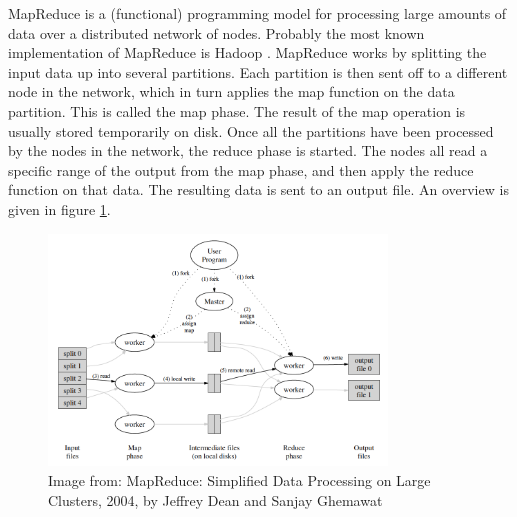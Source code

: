 MapReduce is a (functional) programming model for processing large amounts of data over a distributed network of nodes. Probably the most known implementation of MapReduce is Hadoop \cite{Hadoop}. MapReduce works by splitting the input data up into several partitions. Each partition is then sent off to a different node in the network, which in turn applies the map function on the data partition. This is called the map phase. The result of the map operation is usually stored temporarily on disk. Once all the partitions have been processed by the nodes in the network, the reduce phase is started. The nodes all read a specific range of the output from the map phase, and then apply the reduce function on that data. The resulting data is sent to an output file. An overview is given in figure \ref{fig:mapreduce}.

\begin{figure}[htb]
\includegraphics[width=340px]{mapreduce.png}
\caption{Image from: MapReduce: Simplified Data Processing on Large Clusters, 2004, by Jeffrey Dean and Sanjay Ghemawat}
\label{fig:mapreduce}
\end{figure}

